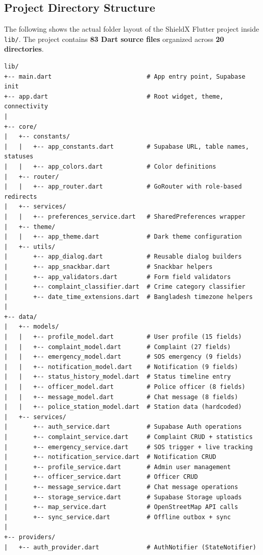 \documentclass[11pt, a4paper]{report}
\begin{document}
\subsection{Project Directory Structure}
The following shows the actual folder layout of the ShieldX Flutter project inside \texttt{lib/}. The project contains \textbf{83 Dart source files} organized across \textbf{20 directories}.
\begin{verbatim}
lib/
+-- main.dart                          # App entry point, Supabase init
+-- app.dart                           # Root widget, theme, connectivity
|
+-- core/
|   +-- constants/
|   |   +-- app_constants.dart         # Supabase URL, table names, statuses
|   |   +-- app_colors.dart            # Color definitions
|   +-- router/
|   |   +-- app_router.dart            # GoRouter with role-based redirects
|   +-- services/
|   |   +-- preferences_service.dart   # SharedPreferences wrapper
|   +-- theme/
|   |   +-- app_theme.dart             # Dark theme configuration
|   +-- utils/
|       +-- app_dialog.dart            # Reusable dialog builders
|       +-- app_snackbar.dart          # Snackbar helpers
|       +-- app_validators.dart        # Form field validators
|       +-- complaint_classifier.dart  # Crime category classifier
|       +-- date_time_extensions.dart  # Bangladesh timezone helpers
|
+-- data/
|   +-- models/
|   |   +-- profile_model.dart         # User profile (15 fields)
|   |   +-- complaint_model.dart       # Complaint (27 fields)
|   |   +-- emergency_model.dart       # SOS emergency (9 fields)
|   |   +-- notification_model.dart    # Notification (9 fields)
|   |   +-- status_history_model.dart  # Status timeline entry
|   |   +-- officer_model.dart         # Police officer (8 fields)
|   |   +-- message_model.dart         # Chat message (8 fields)
|   |   +-- police_station_model.dart  # Station data (hardcoded)
|   +-- services/
|       +-- auth_service.dart          # Supabase Auth operations
|       +-- complaint_service.dart     # Complaint CRUD + statistics
|       +-- emergency_service.dart     # SOS trigger + live tracking
|       +-- notification_service.dart  # Notification CRUD
|       +-- profile_service.dart       # Admin user management
|       +-- officer_service.dart       # Officer CRUD
|       +-- message_service.dart       # Chat message operations
|       +-- storage_service.dart       # Supabase Storage uploads
|       +-- map_service.dart           # OpenStreetMap API calls
|       +-- sync_service.dart          # Offline outbox + sync
|
+-- providers/
|   +-- auth_provider.dart             # AuthNotifier (StateNotifier)

\end{verbatim}
\end{document}
